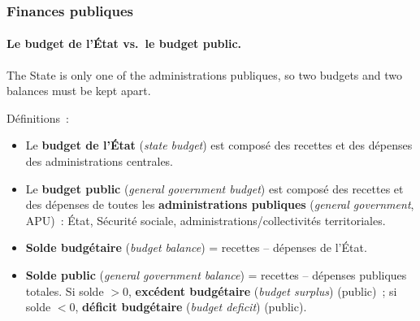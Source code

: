 \subsubsection{Finances publiques}

\paragraph{Le budget de l'État vs.\ le budget public.} The State is only one
of the administrations publiques, so two budgets and two balances must be kept
apart.

\begin{definition}
  Définitions~:
  \begin{itemize}
    \item Le \textbf{budget de l'État} (\textit{state budget}) est composé des
      recettes et des dépenses des administrations centrales.
    \item Le \textbf{budget public} (\textit{general government budget}) est
      composé des recettes et des dépenses de toutes les \textbf{administrations
      publiques} (\textit{general government}, APU)~: État, Sécurité sociale,
      administrations/collectivités territoriales.
    \item \textbf{Solde budgétaire} (\textit{budget balance}) = recettes --
      dépenses de l'État.
    \item \textbf{Solde public} (\textit{general government balance}) = recettes
      -- dépenses publiques totales. Si solde $> 0$, \textbf{excédent budgétaire}
      (\textit{budget surplus}) (public)~; si solde $< 0$, \textbf{déficit
      budgétaire} (\textit{budget deficit}) (public).
  \end{itemize}
\end{definition}

